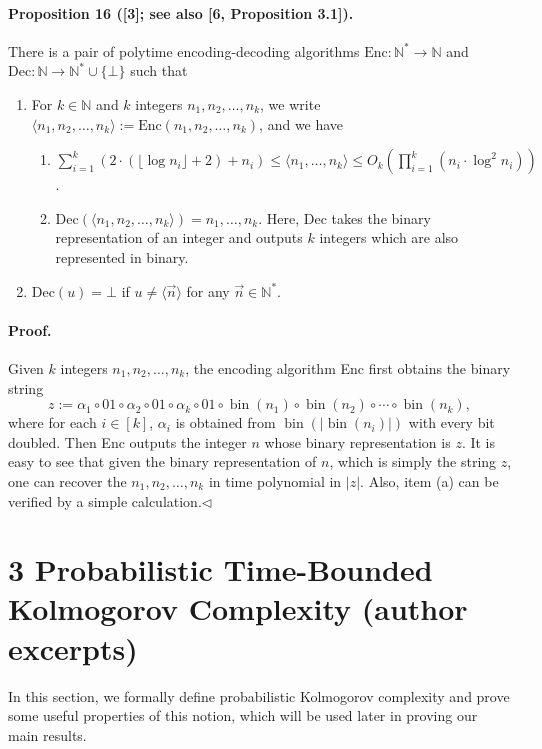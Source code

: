 \paragraph{Proposition 16 ([3]; see also [6, Proposition 3.1]).} There is a pair of polytime encoding-decoding algorithms $\mathrm{Enc}:\mathbb N^*\to\mathbb N$ and $\mathrm{Dec}:\mathbb N\to\mathbb N^*\cup\{\bot\}$ such that
\begin{enumerate}
\item For $k\in\mathbb N$ and $k$ integers $n_1,n_2,\ldots,n_k$, we write $\langle n_1,n_2,\ldots,n_k\rangle:=\mathrm{Enc}(n_1,n_2,\ldots,n_k)$, and we have
\begin{enumerate}
\item $\sum_{i=1}^k(2\cdot(\lfloor\log n_i\rfloor+2)+n_i)\leq\langle n_1,\ldots,n_k\rangle\leq O_k(\prod_{i=1}^k(n_i\cdot\log^2n_i))$.
\item $\mathrm{Dec}(\langle n_1,n_2,\ldots,n_k\rangle)=n_1,\ldots,n_k$. Here, Dec takes the binary representation of an integer and outputs $k$ integers which are also represented in binary.
\end{enumerate}
\item $\mathrm{Dec}(u)=\bot$ if $u\neq\langle\vec n\rangle$ for any $\vec n\in\mathbb N^*$.
\end{enumerate}
\paragraph{Proof.} Given $k$ integers $n_1,n_2,\ldots,n_k$, the encoding algorithm Enc first obtains the binary string
\[z:=\alpha_1\circ01\circ\alpha_2\circ01\circ\alpha_k\circ01\circ\operatorname{bin}(n_1)\circ\operatorname{bin}(n_2)\circ\cdots\circ\operatorname{bin}(n_k),\]
where for each $i\in[k]$, $\alpha_i$ is obtained from $\operatorname{bin}(|\operatorname{bin}(n_i)|)$ with every bit doubled. Then Enc outputs the integer $n$ whose binary representation is $z$. It is easy to see that given the binary representation of $n$, which is simply the string $z$, one can recover the $n_1,n_2,\ldots,n_k$ in time polynomial in $|z|$. Also, item (a) can be verified by a simple calculation.\hfill$\triangleleft$
\section*{3 Probabilistic Time-Bounded Kolmogorov Complexity (author excerpts)}
In this section, we formally define probabilistic Kolmogorov complexity and prove some useful properties of this notion, which will be used later in proving our main results.
